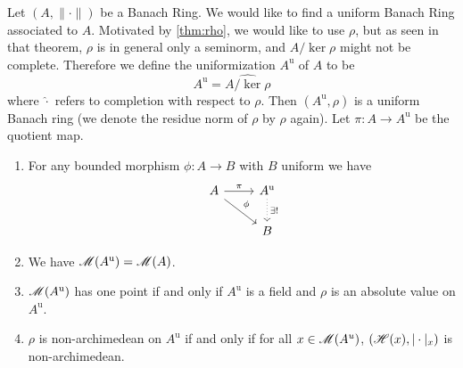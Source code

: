 Let $(A,\|\cdot\|)$ be a Banach Ring. We would like to find a uniform 
Banach Ring associated to $A$. Motivated by \autoref{thm:rho}, we would like to 
use $\rho$, but as seen in that theorem, $\rho$ is in general only a seminorm, 
and $A/\ker\rho$ might not be complete. Therefore we define the uniformization 
$A^\mathrm{u}$ of $A$ to be
\[
  A^\mathrm{u}=\widehat{A/\ker \rho}
\]
where $\hat{\cdot}$ refers to completion with respect to $\rho$. Then 
$(A^\mathrm{u},\rho)$ is a uniform Banach ring (we denote the residue norm of 
$\rho$ by $\rho$ again). Let $\pi\colon A\to A^\mathrm{u}$ be the quotient map.

\begin{theorem}\label{thm:uniformization}
\leavevmode
\begin{enumerate}
\item For any bounded morphism $\phi\colon A\to B$ with $B$ uniform we have
\[
\begin{tikzcd}
  A \ar[dr, "\phi"] \ar[r, "\pi"]
    & A^\mathrm{u} \ar[d, dotted, "\exists !"] \\
  & B
\end{tikzcd}
\]
\item We have $\operatorname{\mathscr{M}}(A^\mathrm{u}) = \operatorname{\mathscr{M}}(A)$.
\item $\operatorname{\mathscr{M}}(A^\mathrm{u})$ has one point if and only if $A^\mathrm{u}$ is 
a field and $\rho$ is an absolute value on $A^\mathrm{u}$.
\item $\rho$ is non-archimedean on $A^\mathrm{u}$ if and only if for all 
$x\in \operatorname{\mathscr{M}}(A^u)$, $(\mathscr{H}(x),{|\cdot|_x})$ is non-archimedean.
\end{enumerate}
\end{theorem}
